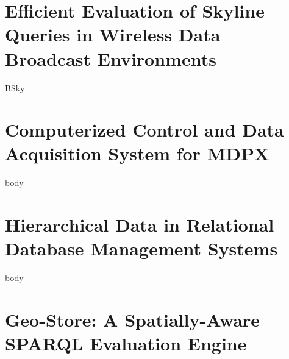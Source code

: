 \documentclass[12pt]{report}
\begin{document}

\chapter{Efficient Evaluation of Skyline Queries in Wireless Data Broadcast Environments}
{BSky}

\chapter{Computerized Control and Data Acquisition System for MDPX}
{body}

\chapter{Hierarchical Data in Relational Database Management Systems}
{body}


\chapter{Geo-Store: A Spatially-Aware SPARQL Evaluation Engine}


%

%
%




\end{document}
